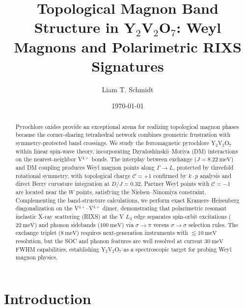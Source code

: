 \documentclass[aps,prb,twocolumn,superscriptaddress,longbibliography]{revtex4-2}
\begin{document}
\title{Topological Magnon Band Structure in Y$_2$V$_2$O$_7$: Weyl Magnons
       and Polarimetric RIXS Signatures}

\author{Liam T. Schmidt}

\date{\today}

\begin{abstract}
Pyrochlore oxides provide an exceptional arena for realizing topological magnon
phases because the corner-sharing tetrahedral network combines
geometric frustration with symmetry-protected band crossings.
We study the ferromagnetic pyrochlore Y$_2$V$_2$O$_7$ within linear spin-wave
theory, incorporating Dzyaloshinskii--Moriya (DM) interactions on the
nearest-neighbor V$^{4+}$ bonds.
The interplay between exchange ($J = \SI{8.22}{\milli\eV}$) and DM coupling
produces Weyl magnon points along $\Gamma \to L$, protected by
threefold rotational symmetry, with topological charge $\mathcal{C} = +1$
confirmed by $k \cdot p$ analysis and direct Berry curvature integration at $D/J = 0.32$.
Partner Weyl points with $\mathcal{C} = -1$ are located near the $W$ points,
satisfying the Nielsen--Ninomiya constraint.
Complementing the band-structure calculations, we perform exact Kramers--Heisenberg
diagonalization on the V$^{4+}$--V$^{4+}$ dimer, demonstrating that polarimetric
resonant inelastic X-ray scattering (RIXS) at the V $L_3$ edge separates
spin-orbit excitations ($\SI{22}{\milli\eV}$) and phonon sidebands
($\SI{100}{\milli\eV}$) via $\sigma \to \pi$ versus $\sigma \to \sigma$
selection rules.
The exchange triplet ($\SI{8}{\milli\eV}$) requires next-generation
instruments with $\lesssim \SI{10}{\milli\eV}$ resolution, but the SOC and
phonon features are well resolved at current $\SI{30}{\milli\eV}$ FWHM
capabilities, establishing Y$_2$V$_2$O$_7$ as a spectroscopic target for
probing Weyl magnon physics.
\end{abstract}

\maketitle

\section{Introduction}
\label{sec:intro}
\end{document}
